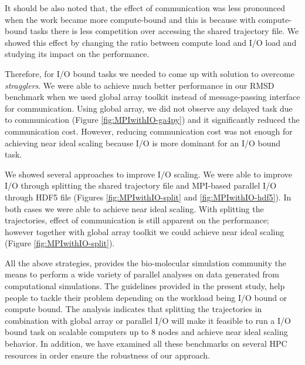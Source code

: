 It should be also noted that, the effect of communication was less pronounced when the work became more compute-bound and this 
is because with compute-bound tasks there is less competition over accessing the shared trajectory file.
We showed this effect by changing the ratio between compute load and I/O load and studying its impact on the performance.

Therefore, for I/O bound tasks we needed to come up with solution to overcome \emph{stragglers}. 
We were able to achieve much better performance in our RMSD benchmark when we used global array toolkit instead of message-passing interface for communication. 
Using global array, we did not observe any delayed task due to communication (Figure \ref{fig:MPIwithIO-ga4py}) and it significantly reduced the communication cost. 
However, reducing communication cost was not enough for achieving near ideal scaling because I/O is more dominant for an I/O bound task.

We showed several approaches to improve I/O scaling.
We were able to improve I/O through splitting the shared trajectory file and MPI-based parallel I/O through HDF5 file (Figures \ref{fig:MPIwithIO-split} and \ref{fig:MPIwithIO-hdf5}). 
In both cases we were able to achieve near ideal scaling.
With splitting the trajectories, effect of communication is still apparent on the performance; however together with 
global array toolkit we could achieve near ideal scaling (Figure \ref{fig:MPIwithIO-split}).

All the above strategies, provides the bio-molecular simulation community the means to perform a wide variety of parallel analyses on data generated from computational simulations.
The guidelines provided in the present study, help people to tackle their problem depending on the workload being I/O bound or compute bound. 
The analysis indicates that splitting the trajectories in combination with global array or parallel I/O will make it feasible to run a I/O bound task on scalable computers up to 8 nodes and achieve near ideal scaling behavior.
In addition, we have examined all these benchmarks on several HPC resources in order ensure the robustness of our approach.